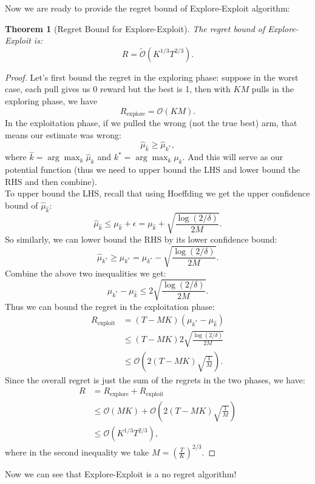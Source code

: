 \documentclass[11pt]{article}
\newtheorem{theorem}{Theorem}
\begin{document}
Now we are ready to provide the regret bound of Explore-Exploit algorithm:
\begin{theorem}
[Regret Bound for Explore-Exploit] The regret bound of Explore-Exploit is:
\[R = \widetilde{\mathcal{O}}(K^{1/3}T^{2/3}).\]
\end{theorem}
\begin{proof}
Let's first bound the regret in the exploring phase: suppose in the worst case, each pull gives us 0 reward but the best is 1, then with $KM$ pulls in the exploring phase, we have 
\[R_{\text{explore}} = \mathcal{O}(KM).\]
In the exploitation phase, if we pulled the wrong (not the true best) arm, that means our estimate was wrong:
\[\widehat{\mu}_{\widehat{k}} \geq \widehat{\mu}_{k^{\ast}},\]
where $\widehat{k} = \arg\max_{k} \widehat{\mu}_k $ and $k^{\ast} = \arg\max_{k} \mu_k$. And this will serve as our potential function (thus we need to upper bound the LHS and lower bound the RHS and then combine). \\
To upper bound the LHS, recall that using Hoeffding we get the upper confidence bound of $\widehat{\mu}_{\widehat{k}}$:
\[\widehat{\mu}_{\widehat{k}} \leq \mu_{\widehat{k}} + \epsilon = \mu_{\widehat{k}} + \sqrt{\frac{\log(2/\delta)}{2M}}.\]
So similarly, we can lower bound the RHS by its lower confidence bound:
\[\widehat{\mu}_{k^{\ast}} \geq \mu_{k^{\ast}} = \mu_{k^{\ast}} - \sqrt{\frac{\log(2/\delta)}{2M}}.\]
Combine the above two inequalities we get:
\[\mu_{k^{\ast}} - \mu_{\widehat{k}} \leq 2\sqrt{\frac{\log(2/\delta)}{2M}}. \]
Thus we can bound the regret in the exploitation phase:
\begin{align*}
    R_{\text{exploit}} &= (T-MK)(\mu_{k^{\ast}} - \mu_{\widehat{k}})\\
    &\leq (T-MK)2\sqrt{\frac{\log(2/\delta)}{2M}}\\
    &\leq \mathcal{O}\left(2(T-MK) \sqrt{\frac{1}{M}}\right).
\end{align*}
Since the overall regret is just the sum of the regrets in the two phases, we have:
\begin{align*}
    R &= R_{\text{explore}} + R_{\text{exploit}} \\
    &\leq \mathcal{O}(MK) +  \mathcal{O}\left(2(T-MK) \sqrt{\frac{1}{M}}\right)\\
    &\leq \mathcal{O}(K^{1/3}T^{2/3}),
\end{align*}
where in the second inequality we take $M = \left(\frac{T}{K}\right)^{2/3}.$
\end{proof}
Now we can see that Explore-Exploit is a no regret algorithm!
\end{document}
